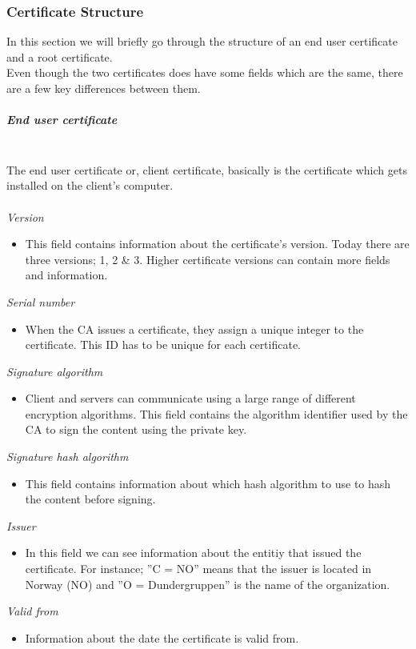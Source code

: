 \subsubsection{Certificate Structure}

In this section we will briefly go through the structure of an end user certificate and a root certificate.\\
Even though the two certificates does have some fields which are the same, there are a few key differences between them.
\subparagraph{End user certificate}~\\
The end user certificate or, client certificate, basically is the certificate which gets installed on the client's computer.\\
\\
\emph{Version}
\begin{itemize}
	\item This field contains information about the certificate's version. Today there are three versions; 1, 2 \& 3. Higher certificate versions can contain more fields and information.
\end{itemize}
\emph{Serial number}
\begin{itemize}
	\item When the CA issues a certificate, they assign a unique integer to the certificate. This ID has to be unique for each certificate.
\end{itemize}
\emph{Signature algorithm}
\begin{itemize}
	\item Client and servers can communicate using a large range of different encryption algorithms. This field contains the algorithm identifier used by the CA to sign the content using the private key.
\end{itemize}
\emph{Signature hash algorithm}
\begin{itemize}
	\item This field contains information about which hash algorithm to use to hash the content before signing.
\end{itemize}
\emph{Issuer}
\begin{itemize}
	\item In this field we can see information about the entitiy that issued the certificate. For instance; ''C = NO'' means that the issuer is located in Norway (NO) and ''O = Dundergruppen'' is the name of the organization. 
\end{itemize}
\emph{Valid from}
\begin{itemize}
	\item Information about the date the certificate is valid from.
\end{itemize}
